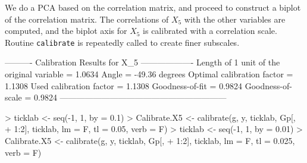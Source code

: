 \documentclass[a4paper]{article}
\begin{document}
We do a PCA based on the correlation matrix, and proceed to construct a biplot of the correlation matrix. The
correlations of $X_5$ with the other variables are computed, and the biplot axis for $X_5$ is calibrated with a 
correlation scale. Routine {\tt calibrate} is repeatedly called to create finer subscales.

\begin{Schunk}
\begin{Soutput}
---------- Calibration Results for  X_5  -------------------
Length of 1 unit of the original variable =  1.0634  
Angle                                     =  -49.36 degrees
Optimal calibration factor                =  1.1308  
Used calibration factor                   =  1.1308  
Goodness-of-fit                           =  0.9824  
Goodness-of-scale                         =  0.9824  
------------------------------------------------------------
\end{Soutput}
\begin{Sinput}
> ticklab <- seq(-1, 1, by = 0.1)
> Calibrate.X5 <- calibrate(g, y, ticklab, Gp[, 
+     1:2], ticklab, lm = F, tl = 0.05, verb = F)
> ticklab <- seq(-1, 1, by = 0.01)
> Calibrate.X5 <- calibrate(g, y, ticklab, Gp[, 
+     1:2], ticklab, lm = F, tl = 0.025, verb = F)
\end{Sinput}
\end{Schunk}
\end{document}
